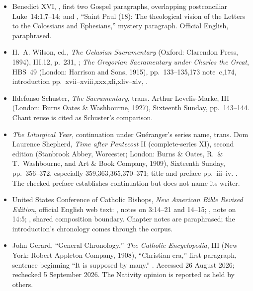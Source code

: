 {\begin{itemize}[leftmargin=1.1em,itemsep=0.3em,parsep=0pt]
\item Benedict XVI, , first two Gospel paragraphs, overlapping postconciliar Luke~14:1,7--14; and , ``Saint Paul (18): The theological vision of the Letters to the Colossians and Ephesians,'' mystery paragraph. Official English, paraphrased.
\item H.~A. Wilson, ed., \textit{The Gelasian Sacramentary} (Oxford: Clarendon Press, 1894), III.12, p.~231, ; \textit{The Gregorian Sacramentary under Charles the Great}, HBS~49 (London: Harrison and Sons, 1915), pp.~133--135,173 note~c,174, introduction pp.~xvii--xviii,xxx,xli,xliv--xlv, .
\item Ildefonso Schuster, \textit{The Sacramentary}, trans. Arthur Levelis-Marke, III (London: Burns Oates \& Washbourne, 1927), Sixteenth Sunday, pp.~143--144. Chant reuse is cited as Schuster's comparison.
\item \textit{The Liturgical Year}, continuation under Guéranger's series name, trans. Dom Laurence Shepherd, \textit{Time after Pentecost} II (complete-series XI), second edition (Stanbrook Abbey, Worcester; London: Burns \& Oates, R.~\& T.~Washbourne, and Art \& Book Company, 1909), Sixteenth Sunday, pp.~356--372, especially 359,363,365,370--371; title and preface pp.~iii--iv. . The checked preface establishes continuation but does not name its writer.
\item United States Conference of Catholic Bishops, \textit{New American Bible Revised Edition}, official English web text: , notes on 3:14--21 and 14--15; , note on 14:5; , shared composition boundary. Chapter notes are paraphrased; the introduction's chronology comes through the corpus.
\item John Gerard, ``General Chronology,'' \textit{The Catholic Encyclopedia}, III (New York: Robert Appleton Company, 1908), ``Christian era,'' first paragraph, sentence beginning ``It is supposed by many.'' . Accessed 26 August 2026; rechecked 5 September 2026. The Nativity opinion is reported as held by others.

\end{itemize}}
